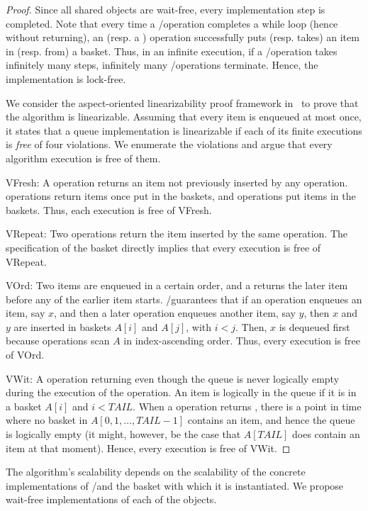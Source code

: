 \begin{proof}
  Since all shared objects are wait-free, every implementation step is completed. Note that every time a \Deq/\Enq operation completes a while loop (hence without returning), an \Enq (resp. a \Deq) operation successfully puts (resp. takes) an item in (resp. from) a basket.  Thus, in an infinite execution, if a \Deq/\Enq operation takes infinitely many steps, infinitely many \Deq/\Enq operations terminate. Hence, the implementation is lock-free.

  We consider the aspect-oriented linearizability proof framework in~\cite{DBLP_conf_concur_HenzingerSV13} to prove that the algorithm is linearizable. Assuming that every item is enqueued at most once, it states that a queue implementation is linearizable if each of its finite executions is \emph{free} of four violations. We enumerate the violations and argue that every algorithm execution is free of them.

  VFresh: A \Deq operation returns an item not previously inserted by any \Enq operation.  \Deq operations return items once put in the baskets, and \Enq operations put items in the baskets. Thus, each execution is free of VFresh.

  VRepeat: Two \Deq operations return the item inserted by the same \Enq operation.  The specification of the basket directly implies that every execution is free of VRepeat.

  VOrd: Two items are enqueued in a certain order, and a \Deq returns the later item before any \Deq of the earlier item starts.  \LL/\IC guarantees that if an \Enq operation enqueues an item, say $x$, and then a later \Enq operation enqueues another item, say $y$, then $x$ and $y$ are inserted in baskets $A[i]$ and $A[j]$, with $i < j$. Then, $x$ is dequeued first because \Deq operations scan $A$ in index-ascending order.  Thus, every execution is free of VOrd.

  VWit: A \Deq operation returning \epty even though the queue is never logically empty during the execution of the \Deq operation.  An item is logically in the queue if it is in a basket $A[i]$ and $i < TAIL$.  When a \Deq operation returns \epty, there is a point in time where no basket in $A[0, 1, \hdots, TAIL-1]$ contains an item, and hence the queue is logically empty (it might, however, be the case that $A[TAIL]$
 does contain an item at that moment).  Hence, every execution is free of VWit.
\end{proof}

The algorithm's scalability depends on the scalability of the concrete implementations of \LL/\IC and the basket with which it is instantiated.  We propose wait-free implementations of each of the objects.

